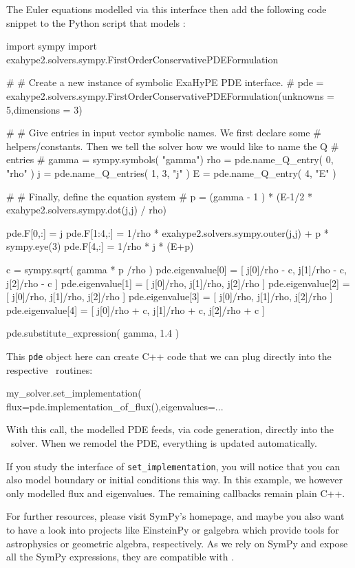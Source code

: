 The Euler equations modelled via this interface then add the following code
snippet to the Python script that models \Peano:

\begin{code}
import sympy
import exahype2.solvers.sympy.FirstOrderConservativePDEFormulation


#
# Create a new instance of symbolic ExaHyPE PDE interface.
#
pde = exahype2.solvers.sympy.FirstOrderConservativePDEFormulation(unknowns = 5,dimensions = 3)

#
# Give entries in input vector symbolic names. We first declare some
# helpers/constants. Then we tell the solver how we would like to name the Q 
# entries
#
gamma = sympy.symbols( "gamma")
rho   = pde.name_Q_entry( 0, "rho" )
j     = pde.name_Q_entries( 1, 3, "j" )
E     = pde.name_Q_entry( 4, "E" )

#
# Finally, define the equation system
#
p = (gamma - 1 ) * (E-1/2 * exahype2.solvers.sympy.dot(j,j) / rho)

pde.F[0,:]   = j
pde.F[1:4,:] = 1/rho * exahype2.solvers.sympy.outer(j,j) + p * sympy.eye(3)
pde.F[4,:]   = 1/rho * j * (E+p)

c = sympy.sqrt( gamma * p /rho )
pde.eigenvalue[0] = [ j[0]/rho - c, j[1]/rho - c, j[2]/rho - c ]
pde.eigenvalue[1] = [ j[0]/rho, j[1]/rho, j[2]/rho ]
pde.eigenvalue[2] = [ j[0]/rho, j[1]/rho, j[2]/rho ]
pde.eigenvalue[3] = [ j[0]/rho, j[1]/rho, j[2]/rho ]
pde.eigenvalue[4] = [ j[0]/rho + c, j[1]/rho + c, j[2]/rho + c ]

pde.substitute_expression( gamma, 1.4 )
\end{code}


\noindent
This \texttt{pde} object here can create C++ code that we can plug directly into
the respective \Peano\ routines:
\begin{code}
my_solver.set_implementation( flux=pde.implementation_of_flux(),eigenvalues=...
\end{code}

\noindent
With this call, the modelled PDE feeds, via code generation, directly into the
\ExaHyPE\ solver. When we remodel the PDE, everything is updated automatically.


If you study the interface of \texttt{set\_implementation}, you will notice that
you can also model boundary or initial conditions this way.
In this example, we however only modelled flux and eigenvalues.
The remaining callbacks remain plain C++.


For further resources, please visit SymPy's homepage, and maybe you also want to
have a look into projects like EinsteinPy or galgebra which provide tools for
astrophysics or geometric algebra, respectively.
As we rely on SymPy and expose all the SymPy expressions, they are compatible
with \ExaHyPE.





